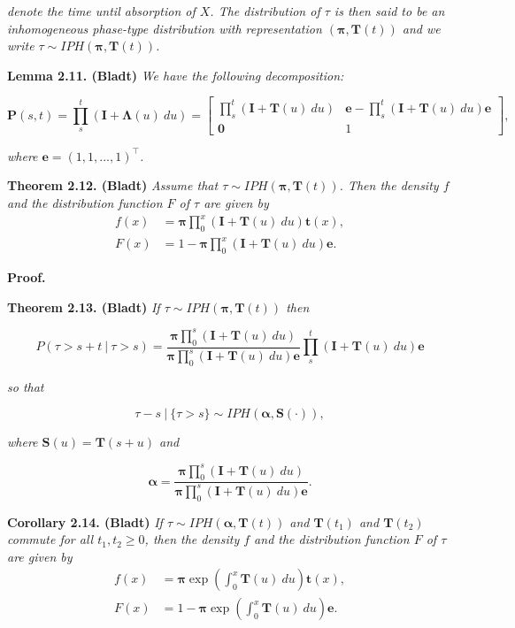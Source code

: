 \documentclass[
]{book}
\begin{document}
\emph{denote the time until absorption of \(X\). The distribution of \(\tau\) is then said to be an inhomogeneous phase-type distribution with representation \((\mathbf{\pi},\mathbf{T}(t))\) and we write \(\tau \sim IPH(\mathbf{\pi},\mathbf{T}(t))\).}

\textbf{Lemma 2.11. (Bladt)} \emph{We have the following decomposition:}

\[
\mathbf{P}(s,t)=\prod_s^t(\mathbf{I}+\mathbf{\Lambda}(u)\ du)=
\begin{bmatrix}
\prod_s^t(\mathbf{I}+\mathbf{T}(u)\ du) & \mathbf{e} -\prod_s^t(\mathbf{I}+\mathbf{T}(u)\ du)\mathbf{e}\\
\mathbf{0} & 1
\end{bmatrix},
\]

\emph{where \(\mathbf{e}=(1,1,...,1)^\top\).}

\textbf{Theorem 2.12. (Bladt)} \emph{Assume that \(\tau \sim IPH(\mathbf{\pi},\mathbf{T}(t))\). Then the density \(f\) and the distribution function \(F\) of \(\tau\) are given by}
\begin{align*}
f(x)&=\mathbf{\pi}\prod_0^x(\mathbf{I}+\mathbf{T}(u)\ du)\mathbf{t}(x),\\
F(x)&=1-\mathbf{\pi}\prod_0^x(\mathbf{I}+\mathbf{T}(u)\ du)\mathbf{e}.
\end{align*}

\textbf{Proof.}

\textbf{Theorem 2.13. (Bladt)} \emph{If \(\tau \sim IPH(\mathbf{\pi},\mathbf{T}(t))\) then}

\[
P(\tau >s+t\ \vert\ \tau >s)=\frac{\mathbf{\pi}\prod_0^s(\mathbf{I}+\mathbf{T}(u)\ du)}{\mathbf{\pi}\prod_0^s(\mathbf{I}+\mathbf{T}(u)\ du)\mathbf{e}}\prod_s^t(\mathbf{I}+\mathbf{T}(u)\ du)\mathbf{e}
\]

\emph{so that}

\[
\tau-s\ \vert\ \{\tau>s\}\sim IPH(\mathbf{\alpha},\mathbf{S}(\cdot)),
\]

\emph{where \(\mathbf{S}(u)=\mathbf{T}(s+u)\) and }

\[
\mathbf{\alpha}=\frac{\mathbf{\pi}\prod_0^s(\mathbf{I}+\mathbf{T}(u)\ du)}{\mathbf{\pi}\prod_0^s(\mathbf{I}+\mathbf{T}(u)\ du)\mathbf{e}}.
\]

\textbf{Corollary 2.14. (Bladt)} \emph{If \(\tau\sim IPH(\mathbf{\alpha},\mathbf{T}(t))\) and \(\mathbf{T}(t_1)\) and \(\mathbf{T}(t_2)\) commute for all \(t_1,t_2\ge 0\), then the density \(f\) and the distribution function \(F\) of \(\tau\) are given by}
\begin{align*}
f(x)&=\mathbf{\pi}\exp\left(\int_0^x\mathbf{T}(u)\ du\right)\mathbf{t}(x),\\
F(x)&=1-\mathbf{\pi}\exp\left(\int_0^x\mathbf{T}(u)\ du\right)\mathbf{e}.
\end{align*}
\end{document}
